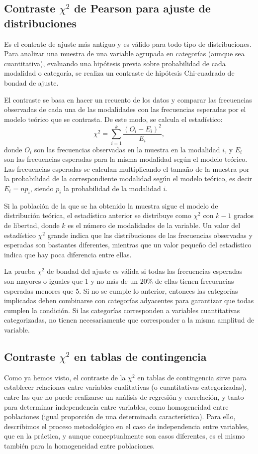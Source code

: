 \subsection{Contraste $\chi^{2}$ de Pearson para ajuste de distribuciones}
Es el contrate de ajuste más antiguo y es válido para todo tipo de
distribuciones. Para analizar una muestra de una variable agrupada
en categorías (aunque sea cuantitativa), evaluando una hipótesis
previa sobre probabilidad de cada modalidad o categoría, se realiza un contraste de hipótesis Chi-cuadrado de bondad de ajuste.

El contraste se basa en hacer un recuento de los datos y comparar las
frecuencias observadas de cada una de las modalidades con las
frecuencias esperadas por el modelo teórico que se contrasta.
De este modo, se calcula el estadístico:
\[
\chi^2 = \sum_{i=1}^k \frac{(O_i-E_i)^2}{E_i},
\]
donde $O_i$ son las frecuencias observadas en la muestra en la
modalidad $i$, y  $E_i$ son las frecuencias esperadas para la
misma modalidad según el modelo teórico. Las frecuencias esperadas
se calculan multiplicando el tamaño de la muestra por la
probabilidad de la correspondiente modalidad según el modelo
teórico, es decir $E_i=np_i$, siendo $p_i$ la probabilidad de la modalidad $i$.

Si la población de la que se ha obtenido la muestra sigue el
modelo de distribución teórica, el estadístico anterior se
distribuye como $\chi^{2}$ con $k-1$ grados de libertad, donde $k$
es el número de modalidades de la variable. Un valor del
estadístico $\chi^{2}$ grande indica que las distribuciones de las
frecuencias observadas y esperadas son bastantes diferentes,
mientras que un valor pequeño del estadístico indica que hay poca
diferencia entre ellas.

La prueba $\chi^2$ de bondad del ajuste es válida si todas las
frecuencias esperadas son mayores o iguales que 1 y no más de un
$20\%$ de ellas tienen frecuencias esperadas menores que 5. Si no
se cumple lo anterior, entonces las categorías implicadas deben
combinarse con categorías adyacentes para garantizar que todas
cumplen la condición. Si las categorías corresponden a variables
cuantitativas categorizadas, no tienen necesariamente que
corresponder a la misma amplitud de variable.


\subsection{Contraste $\chi^{2}$ en tablas de contingencia}
Como ya hemos visto, el contraste de la $\chi^2$ en tablas de
contingencia sirve para establecer relaciones entre variables
cualitativas (o cuantitativas categorizadas), entre las que no
puede realizarse un análisis de regresión y correlación, y tanto
para determinar independencia entre variables, como homogeneidad
entre poblaciones (igual proporción de una determinada
característica). Para ello, describimos el proceso metodológico en
el caso de independencia entre variables, que en la práctica, y
aunque conceptualmente son casos diferentes, es el mismo también
para la homogeneidad entre poblaciones.

